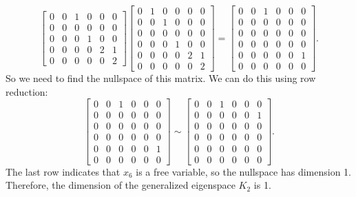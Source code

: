 \documentclass[fontsize=12pt]{scrartcl}
\begin{document}
$$
\begin{bmatrix}
0 & 0 & 1 & 0 & 0 & 0 \\
0 & 0 & 0 & 0 & 0 & 0 \\
0 & 0 & 0 & 1 & 0 & 0 \\
0 & 0 & 0 & 0 & 2 & 1 \\
0 & 0 & 0 & 0 & 0 & 2 \end{bmatrix} \begin{bmatrix} 0 & 1 & 0 & 0 & 0 & 0 \\
0 & 0 & 1 & 0 & 0 & 0 \\
0 & 0 & 0 & 0 & 0 & 0 \\
0 & 0 & 0 & 1 & 0 & 0 \\
0 & 0 & 0 & 0 & 2 & 1 \\
0 & 0 & 0 & 0 & 0 & 2 \end{bmatrix} = \begin{bmatrix} 0 & 0 & 1 & 0 & 0 & 0 \\
0 & 0 & 0 & 0 & 0 & 0 \\
0 & 0 & 0 & 0 & 0 & 0 \\
0 & 0 & 0 & 0 & 0 & 0 \\
0 & 0 & 0 & 0 & 0 & 1 \\
0 & 0 & 0 & 0 & 0 & 0 \end{bmatrix}.$$
So we need to find the nullspace of this matrix. We can do this using row reduction:
$$\begin{bmatrix} 0 & 0 & 1 & 0 & 0 & 0 \\
0 & 0 & 0 & 0 & 0 & 0 \\
0 & 0 & 0 & 0 & 0 & 0 \\
0 & 0 & 0 & 0 & 0 & 0 \\
0 & 0 & 0 & 0 & 0 & 1 \\
0 & 0 & 0 & 0 & 0 & 0 \end{bmatrix} \sim \begin{bmatrix} 0 & 0 & 1 & 0 & 0 & 0 \\
0 & 0 & 0 & 0 & 0 & 1 \\
0 & 0 & 0 & 0 & 0 & 0 \\
0 & 0 & 0 & 0 & 0 & 0 \\
0 & 0 & 0 & 0 & 0 & 0 \\
0 & 0 & 0 & 0 & 0 & 0 \end{bmatrix}.$$
The last row indicates that $x_6$ is a free variable, so the nullspace has dimension 1. Therefore, the dimension of the generalized eigenspace $K_2$ is 1.
\end{document}
